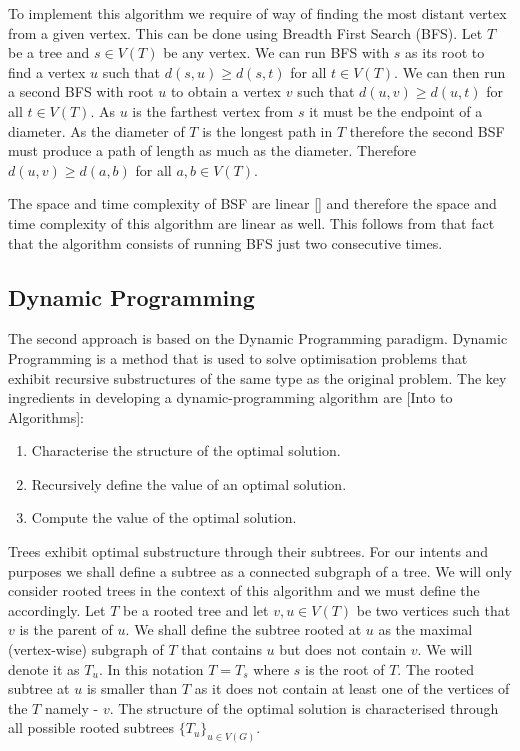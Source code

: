     To implement this algorithm we require of way of finding the most distant vertex from a given vertex. This can be done using Breadth First Search (BFS). Let $T$ be a tree and $s \in V(T)$ be any vertex. We can run BFS with $s$ as its root to find a vertex $u$ such that $d(s, u) \ge d(s, t)$ for all $t \in V(T)$. We can then run a second BFS with root $u$ to obtain a vertex $v$ such that $d(u, v) \ge d(u, t)$ for all $t \in V(T)$. As $u$ is the farthest vertex from $s$ it must be the endpoint of a diameter. As the diameter of $T$ is the longest path in $T$ therefore the second BSF must produce a path of length as much as the diameter. Therefore $d(u, v) \ge d(a, b)$ for all $a,b \in V(T)$.

The space and time complexity of BSF are linear [] and therefore the space and time complexity of this algorithm are linear as well. This follows from that fact that the algorithm consists of running BFS just two consecutive times.

\subsection{Dynamic Programming}

The second approach is based on the Dynamic Programming paradigm. Dynamic Programming is a method that is used to solve optimisation problems that exhibit recursive substructures of the same type as the original problem. The key ingredients in developing a dynamic-programming algorithm are [Into to Algorithms]:


\begin{enumerate}
    \item Characterise the structure of the optimal solution.
    \item Recursively define the value of an optimal solution.
    \item Compute the value of the optimal solution.
\end{enumerate}


Trees exhibit optimal substructure through their subtrees. For our intents and purposes we shall define a subtree as a connected subgraph of a tree. We will only consider rooted trees in the context of this algorithm and we must define the accordingly. Let $T$ be a rooted tree and let $v, u \in V(T)$ be two vertices such that $v$ is the parent of $u$. We shall define the subtree rooted at $u$ as the maximal (vertex-wise) subgraph of $T$ that contains $u$ but does not contain $v$.  We will denote it as $T_u$. In this notation $T = T_s$ where $s$ is the root of $T$. The rooted subtree at $u$ is smaller than $T$ as it does not contain at least one of the vertices of the $T$ namely - $v$. The structure of the optimal solution is characterised through all possible rooted subtrees $\{T_u\}_{u \in V(G)}$.

